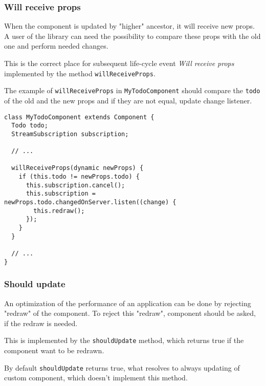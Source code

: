 \documentclass[oneside, 12pt]{book}
\begin{document}
    \subsubsection{Will receive props}\label{subsec:our-architecture-lifecycle-willreceiveprops}

			When the component is updated by "higher" ancestor, it will receive new props.
			A user of the library can need the possibility to compare these props with the old one
			and perform needed changes. 

			This is the correct place for subsequent life-cycle event \textit{Will receive props}
      implemented by the method \texttt{willReceiveProps}. 

      The example of \texttt{willReceiveProps} in \texttt{MyTodoComponent} 
      should compare the \texttt{todo} of the old and the new props and if they are not equal, 
      update change listener.
      \begin{verbatim}
class MyTodoComponent extends Component {
  Todo todo;
  StreamSubscription subscription;

  // ...

  willReceiveProps(dynamic newProps) {
    if (this.todo != newProps.todo) {
      this.subscription.cancel();
      this.subscription = newProps.todo.changedOnServer.listen((change) {
        this.redraw();
      });
    }
  }

  // ...
}
      \end{verbatim}



      
    \subsubsection{Should update}\label{subsec:our-architecture-lifecycle-shouldupdate}

			An optimization of the performance of an application can be done by rejecting "redraw" of the component.
			To reject this "redraw", component should be asked, if the redraw is needed. 

			This is implemented by the \texttt{shouldUpdate} method, which returns true if the component want to be redrawn. 

			By default \texttt{shouldUpdate} returns true, 
      what resolves to always updating of custom component, which doesn't implement this method.
\end{document}
